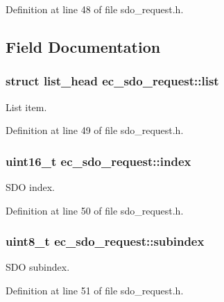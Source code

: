 \-Definition at line 48 of file sdo\-\_\-request.\-h.



\subsection{\-Field \-Documentation}
\subsubsection[{list}]{\setlength{\rightskip}{0pt plus 5cm}struct list\-\_\-head {\bf ec\-\_\-sdo\-\_\-request\-::list}}\label{structec__sdo__request_a80c68878d98d613513a0b985be43198e}


\-List item. 



\-Definition at line 49 of file sdo\-\_\-request.\-h.

\subsubsection[{index}]{\setlength{\rightskip}{0pt plus 5cm}uint16\-\_\-t {\bf ec\-\_\-sdo\-\_\-request\-::index}}\label{structec__sdo__request_ad8ef54b4c7495a17c81eabff59e079fd}


\-S\-D\-O index. 



\-Definition at line 50 of file sdo\-\_\-request.\-h.

\subsubsection[{subindex}]{\setlength{\rightskip}{0pt plus 5cm}uint8\-\_\-t {\bf ec\-\_\-sdo\-\_\-request\-::subindex}}\label{structec__sdo__request_af3b7a335ce659260bed0d04f90ba9e4a}


\-S\-D\-O subindex. 



\-Definition at line 51 of file sdo\-\_\-request.\-h.

